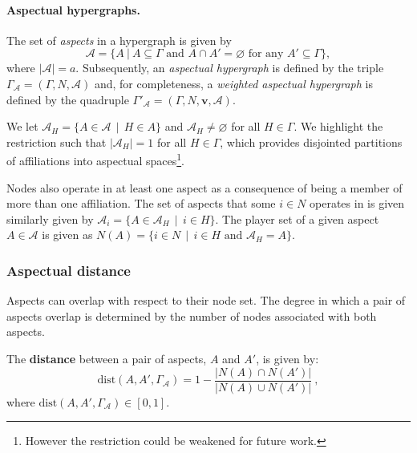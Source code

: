 \paragraph{Aspectual hypergraphs.}

The set of \emph{aspects} in a hypergraph is given by
\begin{equation}
\mathcal{A} = \{ A ~ | ~ A \subseteq \Gamma \mbox{ and } A \cap A' = \varnothing \mbox{ for any } A' \subseteq \Gamma \} ,
\end{equation}
where $| \mathcal{A} | = a$. Subsequently, an \emph{aspectual hypergraph} is defined by the triple $\Gamma_{\mathcal{A}} = (\Gamma, N, \mathcal{A})$ and, for completeness, a \emph{weighted aspectual hypergraph} is defined by the quadruple $\Gamma'_{\mathcal{A}}= (\Gamma, N, \mathbf{v}, \mathcal{A})$.

We let $\mathcal{A}_{H} = \{ A \in \mathcal{A} \, \mid \, H \in A\}$ and $\mathcal{A}_{H} \neq \varnothing$ for all $H \in \Gamma$. We highlight the restriction such that $| \mathcal{A}_{H} | = 1$ for all $H \in \Gamma$, which provides disjointed partitions of affiliations into aspectual spaces\footnote{However the restriction could be weakened for future work.}.

Nodes also operate in at least one aspect as a consequence of being a member of more than one affiliation. The set of aspects that some $i \in N$ operates in is given similarly given by $\mathcal{A}_{i} = \{ A \in \mathcal{A}_{H} \, \mid \, i \in H \}$. The player set of a given aspect $A \in \mathcal{A}$ is given as $N(A) = \{ i \in N \, \mid \, i \in H \text{ and } \mathcal{A}_{H} = A \}$.

\subsubsection*{Aspectual distance}

Aspects can overlap with respect to their node set. The degree in which a pair of aspects overlap is determined by the number of nodes associated with both aspects.

\begin{definition}
The \textbf{distance} between a pair of aspects, $A$ and $A'$, is given by:
\begin{equation}
\mbox{dist}(A, A',\Gamma_{\mathcal{A}}) = 1 - \frac{| N(A) \cap N(A') |}{| N(A) \cup N(A') |} ~ ,
\end{equation}
where $\mbox{dist}(A, A',\Gamma_{\mathcal{A}}) \in [0,1]$.
\end{definition}

